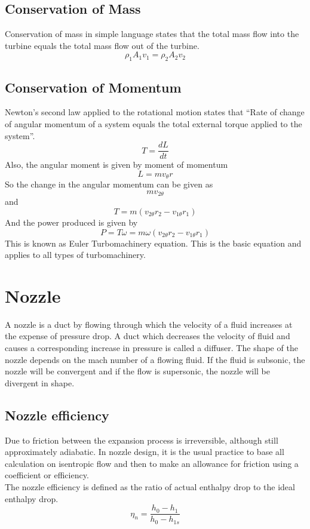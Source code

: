 \documentclass[english,11pt]{report}
\begin{document}
\subsection{Conservation of Mass}
Conservation of mass in simple language states that the total mass flow into the turbine equals the total mass flow out of the turbine.
$$\rho_1A_1v_1 = \rho_2A_{2}v_{2} $$
\subsection{Conservation of Momentum}
Newton’s second law applied to the rotational motion states that “Rate of change of angular momentum of a system equals the total external torque applied to the system”.
$$T = \frac{dL}{dt}$$
Also, the angular moment is given by moment of momentum
$$L = mv_\theta r$$
So the change in the angular momentum can be given as
$$mv_{2\theta}$$
and
$$T = m(v_{2\theta}r_2 - v_{1\theta}r_1)$$
And the power produced is given by
$$P = T\omega = m\omega(v_{2\theta}r_2 - v_{1\theta}r_1)$$
This is known as Euler Turbomachinery equation. This is the basic equation and applies to all
types of turbomachinery.

\section{Nozzle}
A nozzle is a duct by flowing through which the velocity of a fluid increases at the expense of pressure drop. A duct which decreases the velocity of fluid and causes a corresponding increase in pressure is called a diffuser. The shape of the nozzle depends on the mach number of a flowing fluid. If the fluid is subsonic, the nozzle will be convergent and if the flow is supersonic, the nozzle will be divergent in shape. 

\subsection{Nozzle efficiency}
Due to friction between the expansion process is irreversible, although still approximately adiabatic. In nozzle design, it is the usual practice to base all calculation on isentropic flow and then to make an allowance for friction using a coefficient or efficiency. \\
The nozzle efficiency is defined as the ratio of actual enthalpy drop to the ideal enthalpy drop.
$$ \eta_n = \frac{h_0 - h_1}{h_0 - h_{1s}} $$
\end{document}
